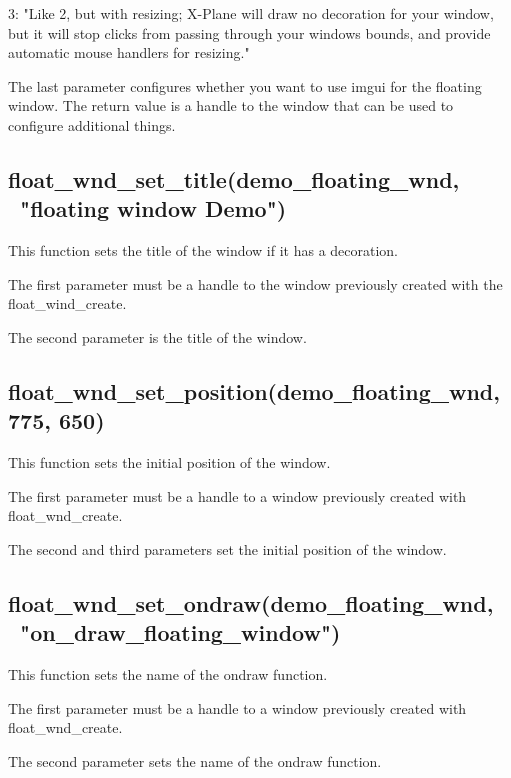 \documentclass[11pt,parskip=half,a4paper]{scrartcl}
\begin{document}
\hspace*{10mm}	3: "Like 2, but with resizing; X-Plane will draw no decoration for your window, but
\hspace*{10mm}	it will stop clicks from passing through your windows bounds, and provide automatic
\hspace*{10mm}	mouse handlers for resizing."

The last parameter configures whether you want to use imgui for the floating window.
The return value is a handle to the window that can be used to configure additional things.

\subsection{\hspace*{1.0mm}float\_wnd\_set\_title(demo\_floating\_wnd, \ "floating window Demo")}

This function sets the title of the window if it has a decoration.

The first parameter must be a handle to the window previously created with the float\_wind\_create.

The second parameter is the title of the window.


\subsection{\hspace*{1.0mm}float\_wnd\_set\_position(demo\_floating\_wnd, 775, 650)}

This function sets the initial position of the window.

The first parameter must be a handle to a window previously created with float\_wnd\_create.

The second and third parameters set the initial position of the window.

\subsection{\hspace*{1.0mm}float\_wnd\_set\_ondraw(demo\_floating\_wnd, \ "on\_draw\_floating\_window")}

This function sets the name of the ondraw function.

The first parameter must be a handle to a window previously created with float\_wnd\_create.

The second parameter sets the name of the ondraw function.
\end{document}
